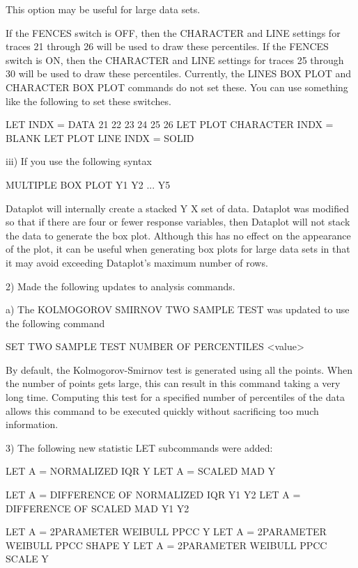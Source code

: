              This option may be useful for large data sets.

             If the FENCES switch is OFF, then the CHARACTER and LINE
             settings for traces 21 through 26 will be used to draw these
             percentiles.  If the FENCES switch is ON, then the CHARACTER
             and LINE settings for traces 25 through 30 will be used to
             draw these percentiles.  Currently, the LINES BOX PLOT and
             CHARACTER BOX PLOT commands do not set these.  You can use
             something like the following to set these switches.

                LET INDX = DATA 21 22 23 24 25 26
                LET PLOT CHARACTER INDX = BLANK
                LET PLOT LINE      INDX = SOLID

        iii) If you use the following syntax

                MULTIPLE BOX PLOT Y1 Y2 ... Y5

             Dataplot will internally create a stacked Y X set of data.
             Dataplot was modified so that if there are four or fewer
             response variables, then Dataplot will not stack the data
             to generate the box plot.  Although this has no effect on
             the appearance of the plot, it can be useful when generating
             box plots for large data sets in that it may avoid exceeding
             Dataplot's maximum number of rows.

 2) Made the following updates to analysis commands.

    a) The KOLMOGOROV SMIRNOV TWO SAMPLE TEST was updated to use the
       following command

           SET TWO SAMPLE TEST NUMBER OF PERCENTILES <value>

       By default, the Kolmogorov-Smirnov test is generated using all
       the points.  When the number of points gets large, this can result
       in this command taking a very long time.  Computing this test for
       a specified number of percentiles of the data allows this command
       to be executed quickly without sacrificing too much information.

 3) The following new statistic LET subcommands were added:

       LET A = NORMALIZED IQR Y
       LET A = SCALED MAD Y

       LET A = DIFFERENCE OF NORMALIZED IQR Y1 Y2
       LET A = DIFFERENCE OF SCALED MAD Y1 Y2

       LET A = 2PARAMETER WEIBULL PPCC Y
       LET A = 2PARAMETER WEIBULL PPCC SHAPE Y
       LET A = 2PARAMETER WEIBULL PPCC SCALE Y

